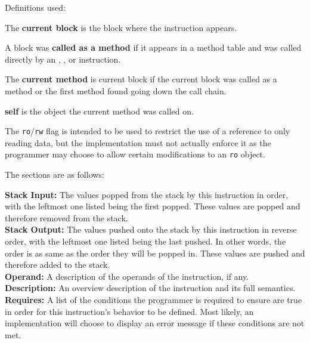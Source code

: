 \documentclass[letterpaper,12pt]{article}
\newcommand{\code}[1]{\texttt{#1}}
\newcommand{\ro}{\code{ro}}
\newcommand{\rw}{\code{rw}}
\begin{document}
{{{{\newcommand{\mnsectitle}[1]{\nopagebreak\noindent\textbf{#1: }}
\newcommand{\mnpart}[2]{\mnsectitle{#1}#2 \\}

\newcommand{\mnin}[1]{\mnpart{Stack Input}{#1}}
\newcommand{\mnout}[1]{\mnpart{Stack Output}{#1}}
\newcommand{\mnop}[1]{\mnpart{Operand}{#1}}
\newcommand{\mndesc}[1]{\mnpart{Description}{#1}}
\newcommand{\mnreq}[1]{\mnpart{Requires}{#1}}

\newcommand{\mnnoin}{\mnin{None}}
\newcommand{\mnnoout}{\mnout{None}}
\newcommand{\mnnoop}{\mnop{None}}
\newcommand{\mnnoreq}{\mnreq{None}}

Definitions used:

The \textbf{current block} is the block where the instruction appears.

A block was \textbf{called as a method} if it appears in a method table
and was called directly by an , , or 
instruction.

The \textbf{current method}
is current block if the current block was called as a method or
the first method found going down the call chain.

\textbf{self} is the object the current method was called on.

The \ro{}/\rw{} flag is intended to be used
to restrict the use of a reference to only reading data, but
the implementation must not actually enforce it as the
programmer may choose to allow certain modifications
to an \ro{} object.

The sections are as follows:

\mnin{The values popped from the stack by this instruction in order,
	with the leftmost one listed being the first popped.
	These values are popped and therefore removed from the stack.}

\mnout{The values pushed onto the stack by this instruction in reverse order,
	with the leftmost one listed being the last pushed. In other words,
	the order is as same as the order they will be popped in.
	These values are pushed and therefore added to the stack.}

\mnop{A description of the operands of the instruction, if any.}

\mndesc{An overview description of the instruction and its full semantics.}

\mnreq{A list of the conditions the programmer is required to ensure are
	true in order for this instruction's behavior to be defined.
	Most likely, an implementation will choose to display an error
	message if these conditions are not met.}


}}}}
\end{document}
